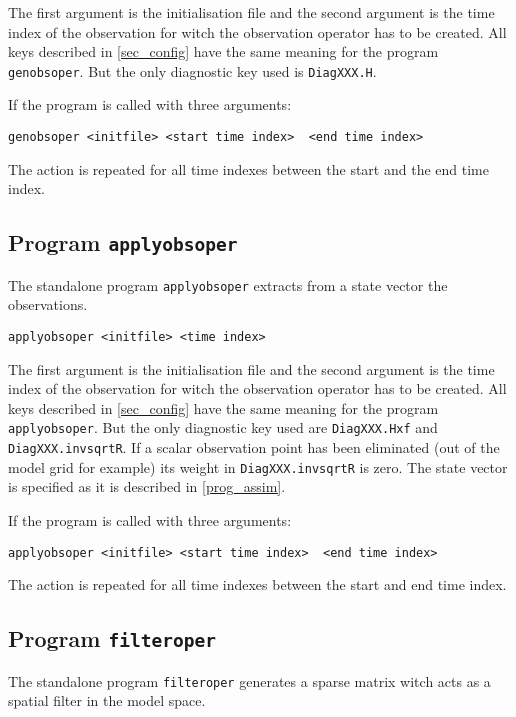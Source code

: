 \documentclass[a4paper,12pt]{article}
\newcommand{\code}{\texttt}
\begin{document}
The first argument is the initialisation file and the second argument is the time index of the observation for witch the observation operator has to be created. All keys described in \ref{sec_config} have the same meaning for the program \code{genobsoper}. But the only diagnostic key used is \code{DiagXXX.H}.

If the program is called with three arguments:

\begin{verbatim}
genobsoper <initfile> <start time index>  <end time index>
\end{verbatim}

The action is repeated for all time indexes between the start and the end time index.

\subsection{Program \code{applyobsoper}}

The standalone program \code{applyobsoper} extracts from a state vector the observations.

\begin{verbatim}
applyobsoper <initfile> <time index>
\end{verbatim}

The first argument is the initialisation file and the second argument is the time index of the observation for witch the observation operator has to be created. All keys described in \ref{sec_config} have the same meaning for the program \code{applyobsoper}. But the only diagnostic key used are \code{DiagXXX.Hxf} and \code{DiagXXX.invsqrtR}. If a scalar observation point has
been eliminated (out of the model grid for example) its weight in \code{DiagXXX.invsqrtR} is zero. The state vector is specified as it is described in \ref{prog_assim}.

If the program is called with three arguments:

\begin{verbatim}
applyobsoper <initfile> <start time index>  <end time index>
\end{verbatim}

The action is repeated for all time indexes between the start and end time index.

\subsection{Program \code{filteroper}}

The standalone program \code{filteroper} generates a sparse matrix witch acts as a spatial filter in the model space. 
\end{document}
